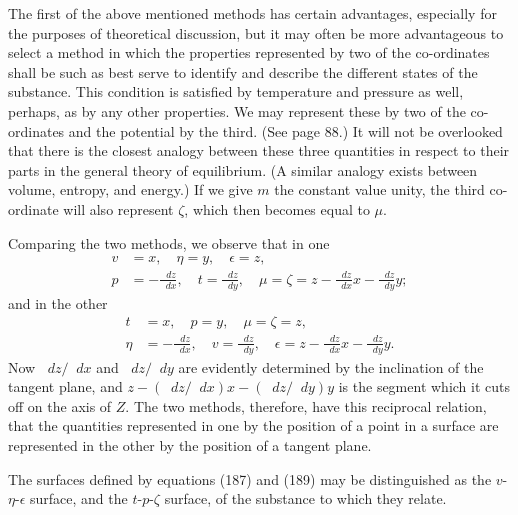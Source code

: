 \documentclass[11pt]{article}
\newcommand{\dd}{\mathop{}\!d}
\newcommand{\eps}{\epsilon}
\begin{document}
The first of the above mentioned methods has certain advantages, especially for the purposes of theoretical discussion, but it may often be more advantageous to select a method in which the properties represented by two of the co-ordinates shall be such as best serve to identify and describe the different states of the substance. This condition is satisfied by temperature and pressure as well, perhaps, as by any other properties. We may represent these by two of the co-ordinates and the potential by the third. (See page 88.) It will not be overlooked that there is the closest analogy between these three quantities in respect to their parts in the general theory of equilibrium. (A similar analogy exists between volume, entropy, and energy.) If we give $m$ the constant value unity, the third co-ordinate will also represent $\zeta$, which then becomes equal to $\mu$.

Comparing the two methods, we observe that in one
\begin{align}
v&=x,\quad \eta=y,\quad \eps=z, \tag{187}\label{eq:gibbs-v1-p3-187}\\
p&=-\frac{\dd z}{\dd x},\quad t=\frac{\dd z}{\dd y},\quad
\mu=\zeta=z-\frac{\dd z}{\dd x}x-\frac{\dd z}{\dd y}y; \tag{188}\label{eq:gibbs-v1-p3-188}
\end{align}
and in the other
\begin{align}
t&=x,\quad p=y,\quad \mu=\zeta=z, \tag{189}\label{eq:gibbs-v1-p3-189}\\
\eta&=-\frac{\dd z}{\dd x},\quad v=\frac{\dd z}{\dd y},\quad
\eps=z-\frac{\dd z}{\dd x}x-\frac{\dd z}{\dd y}y. \tag{190}\label{eq:gibbs-v1-p3-190}
\end{align}
Now $\dd z/\dd x$ and $\dd z/\dd y$ are evidently determined by the inclination of the tangent plane, and $z-(\dd z/\dd x)x-(\dd z/\dd y)y$ is the segment which it cuts off on the axis of $Z$. The two methods, therefore, have this reciprocal relation, that the quantities represented in one by the position of a point in a surface are represented in the other by the position of a tangent plane.

The surfaces defined by equations (187) and (189) may be distinguished as the $v$-$\eta$-$\eps$ surface, and the $t$-$p$-$\zeta$ surface, of the substance to which they relate.
\end{document}
